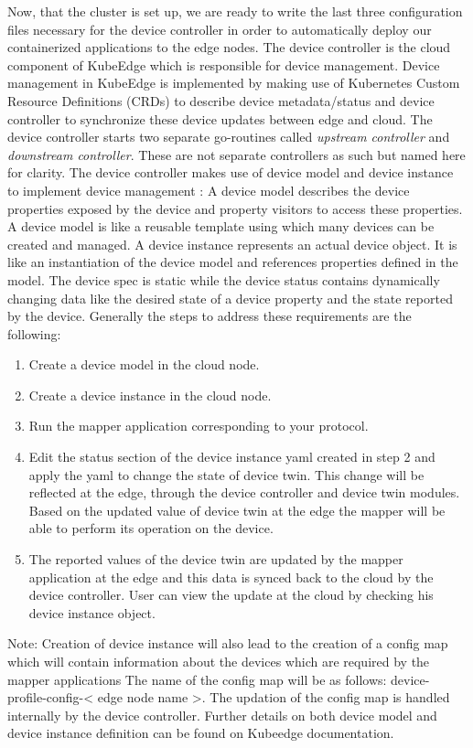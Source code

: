 Now, that the cluster is set up, we are ready to write the last three configuration files necessary for the device controller in order to automatically deploy our containerized applications to the edge nodes.
The device controller is the cloud component of KubeEdge which is responsible for device management. Device management in KubeEdge is implemented by making use of Kubernetes Custom Resource Definitions (CRDs) to describe device metadata/status and device controller to synchronize these device updates between edge and cloud. The device controller starts two separate go-routines called \textit{upstream controller} and \textit{downstream controller}. These are not separate controllers as such but named here for clarity.
The device controller makes use of device model and device instance to implement device management :
A device model describes the device properties exposed by the device and property visitors to access these properties. A device model is like a reusable template using which many devices can be created and managed. A device instance represents an actual device object. It is like an instantiation of the device model and references properties defined in the model. The device spec is static while the device status contains dynamically changing data like the desired state of a device property and the state reported by the device.
Generally the steps to address these requirements are the following:
\begin{enumerate}
	\item Create a device model in the cloud node.
	\item Create a device instance in the cloud node.
	\item Run the mapper application corresponding to your protocol.
	\item Edit the status section of the device instance yaml created in step 2 and apply the yaml to change the state of device twin. This change will be reflected at the edge, through the device controller and device twin modules. Based on the updated value of device twin at the edge the mapper will be able to perform its operation on the device.
	\item The reported values of the device twin are updated by the mapper application at the edge and this data is synced back to the cloud by the device controller. User can view the update at the cloud by checking his device instance object.
\end{enumerate}

Note: Creation of device instance will also lead to the creation of a config map which will contain information about the devices which are required by the mapper applications The name of the config map will be as follows: device-profile-config-< edge node name >. The updation of the config map is handled internally by the device controller.
Further details on both device model and device instance definition can be found on Kubeedge documentation.

